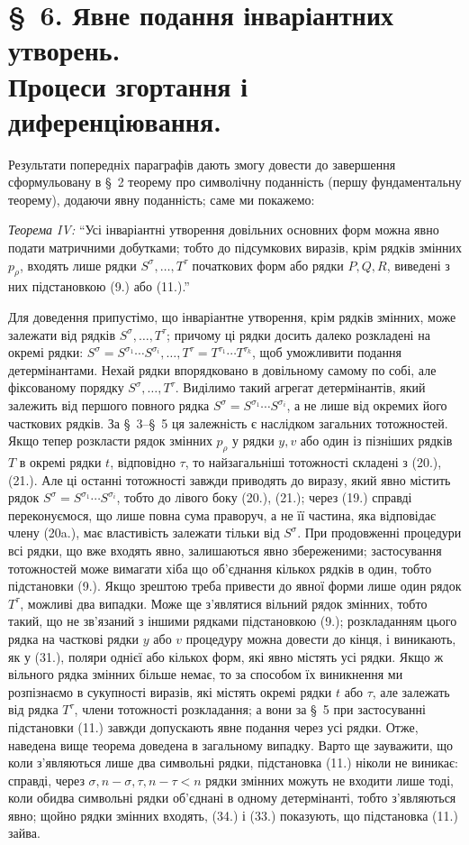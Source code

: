 \documentclass[11pt]{article}
\begin{document}
\section*{\S\ 6. Явне подання інваріантних утворень.\\Процеси згортання і диференціювання.}

Результати попередніх параграфів дають змогу довести до завершення сформульовану в \S\ 2 теорему про символічну поданність (першу фундаментальну теорему), додаючи явну поданність; саме ми покажемо:

\emph{Теорема IV:} ``Усі інваріантні утворення довільних основних форм можна явно подати матричними добутками; тобто до підсумкових виразів, крім рядків змінних $p_\rho$, входять лише рядки $S^\sigma,\ldots,T^\tau$ початкових форм або рядки $P,Q,R$, виведені з них підстановкою (9.) або (11.).''

Для доведення припустімо, що інваріантне утворення, крім рядків змінних, може залежати від рядків $S^\sigma,\ldots,T^\tau$; причому ці рядки досить далеко розкладені на окремі рядки:
$S^\sigma=S^{\sigma_1}\cdots S^{\sigma_i},\ldots,T^\tau=T^{\tau_1}\cdots T^{\tau_k}$, щоб уможливити подання детермінантами. Нехай рядки впорядковано в довільному самому по собі, але фіксованому порядку $S^\sigma,\ldots,T^\tau$. Виділимо такий агрегат детермінантів, який залежить від першого повного рядка $S^\sigma=S^{\sigma_1}\cdots S^{\sigma_i}$, а не лише від окремих його часткових рядків. За \S\ 3--\S\ 5 ця залежність є наслідком загальних тотожностей. Якщо тепер розкласти рядок змінних $p_\rho$ у рядки $y,v$ або один із пізніших рядків $T$ в окремі рядки $t$, відповідно $\tau$, то найзагальніші тотожності складені з (20.), (21.). Але ці останні тотожності завжди приводять до виразу, який явно містить рядок $S^\sigma=S^{\sigma_1}\cdots S^{\sigma_i}$, тобто до лівого боку (20.), (21.); через (19.) справді переконуємося, що лише повна сума праворуч, а не її частина, яка відповідає члену (20a.), має властивість залежати тільки від $S^\sigma$. При продовженні процедури всі рядки, що вже входять явно, залишаються явно збереженими; застосування тотожностей може вимагати хіба що об'єднання кількох рядків в один, тобто підстановки (9.). Якщо зрештою треба привести до явної форми лише один рядок $T^\tau$, можливі два випадки. Може ще з'являтися вільний рядок змінних, тобто такий, що не зв'язаний з іншими рядками підстановкою (9.); розкладанням цього рядка на часткові рядки $y$ або $v$ процедуру можна довести до кінця, і виникають, як у (31.), поляри однієї або кількох форм, які явно містять усі рядки. Якщо ж вільного рядка змінних більше немає, то за способом їх виникнення ми розпізнаємо в сукупності виразів, які містять окремі рядки $t$ або $\tau$, але залежать від рядка $T^\tau$, члени тотожності розкладання; а вони за \S\ 5 при застосуванні підстановки (11.) завжди допускають явне подання через усі рядки. Отже, наведена вище теорема доведена в загальному випадку. Варто ще зауважити, що коли з'являються лише два символьні рядки, підстановка (11.) ніколи не виникає: справді, через $\sigma,n-\sigma,\tau,n-\tau<n$ рядки змінних можуть не входити лише тоді, коли обидва символьні рядки об'єднані в одному детермінанті, тобто з'являються явно; щойно рядки змінних входять, (34.) і (33.) показують, що підстановка (11.) зайва.
\end{document}
